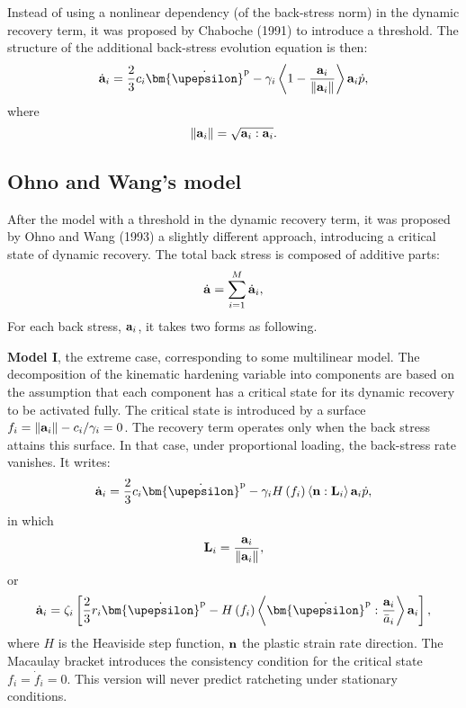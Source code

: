 Instead of using a nonlinear dependency (of the back-stress norm) in the dynamic recovery term, it was proposed by Chaboche (1991) \cite{Chaboche1991661} to introduce a threshold. The structure of the additional back-stress evolution equation is then:
\begin{equation}
{\dot{\bf a}}_i = \frac{2}{3}c_i{{\bm{\dot \upepsilon }}^{\rm{p}}} - {\gamma _i} \left\langle {1 - \frac{{\bf{a}}_i}{{\left\| {\bf{a}}_i \right\|}}} \right\rangle {\bf{a}}_i\dot p,
\end{equation}
where
\begin{equation}
\left\| {\bf{a}}_i \right\| = \sqrt {{\bf{a}}_i:{\bf{a}}_i}.
\end{equation}

\subsection{Ohno and Wang's model}
\noindent
After the model with a threshold in the dynamic recovery term, it was proposed by Ohno and Wang (1993) \cite{ohno1993kinematic} a slightly different approach, introducing a critical state of dynamic recovery.
The total back stress is composed of additive parts:
\begin{equation}
{\dot{\bf a}} = \sum\limits_{i = 1}^M {{{{\dot{\bf a}}}_i}},
\end{equation}
For each back stress, ${\bf{a}}_i$, it takes two forms as following.

\textbf{Model I}, the extreme case, corresponding to some multilinear model.
The decomposition of the kinematic hardening variable into components are based on the assumption that each component has a critical state for its dynamic recovery to be activated fully.
The critical state is introduced by a surface ${f_i} = \left\| {{{\bf{a}}_i}} \right\| - {c_i}/{\gamma _i} = 0$.
The recovery term operates only when the back stress attains this surface.
In that case, under proportional loading, the back-stress rate vanishes. It writes:
\begin{equation}
{{\dot{\bf a}}_i} = \frac{2}{3}{c_i}{{\bm{\dot \upepsilon }}^{\rm{p}}} - {\gamma _i}H\left( {{f_i}} \right)\left\langle {{\bf{n}}:{{\bf{L}}_i}} \right\rangle {{\bf{a}}_i}\dot p,
\end{equation}
in which
\begin{equation}
{{\bf{L}}_i} = \frac{{{{\bf{a}}_i}}}{{\left\| {{{\bf{a}}_i}} \right\|}},
\end{equation}
or
\begin{equation}
{{\dot{\bf a}}_i} = {\zeta _i}\left[ {\frac{2}{3}{r_i}{{{\bm{\dot \upepsilon }}}^{\rm{p}}} - H\left( {{f_i}} \right)\left\langle {{{{\bm{\dot \upepsilon }}}^{\rm{p}}}:\frac{{{{\bf{a}}_i}}}{{{{\bar a}_i}}}} \right\rangle {{\bf{a}}_i}} \right],
\label{Eqn:Introduction2}
\end{equation}
where $H$ is the Heaviside step function, ${\bf{n}}$ the plastic strain rate direction.
The Macaulay bracket introduces the consistency condition for the critical state ${f_i} = {\dot f_i} = 0$.
This version will never predict ratcheting under stationary conditions.

